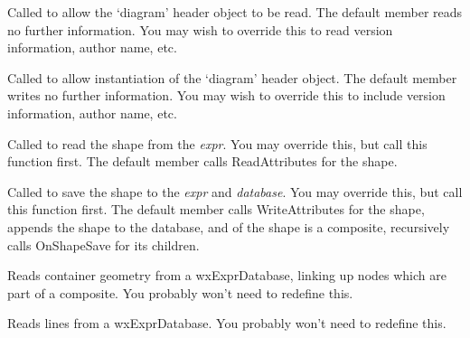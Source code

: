

Called to allow the `diagram' header object to be read. The default member reads no further information.
You may wish to override this to read version information, author name, etc.



Called to allow instantiation of the `diagram' header object. The default member writes no further information.
You may wish to override this to include version information, author name, etc.



Called to read the shape from the {\it expr}. You may override this, but call this function first.
The default member calls ReadAttributes for the shape.



Called to save the shape to the {\it expr} and {\it database}. You may override this, but call this function first.
The default member calls WriteAttributes for the shape, appends the shape to the database, and of the shape
is a composite, recursively calls OnShapeSave for its children.



Reads container geometry from a wxExprDatabase, linking up nodes which
are part of a composite. You probably won't need to redefine this.



Reads lines from a wxExprDatabase. You probably won't need to redefine this.


